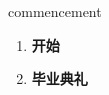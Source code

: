 
\begin{frame}
{\huge commencement}
\begin{center}
\begin{enumerate}\Large
  \item \textbf{开始}
  \item \textbf{毕业典礼}
\end{enumerate}
\end{center}
\end{frame}
